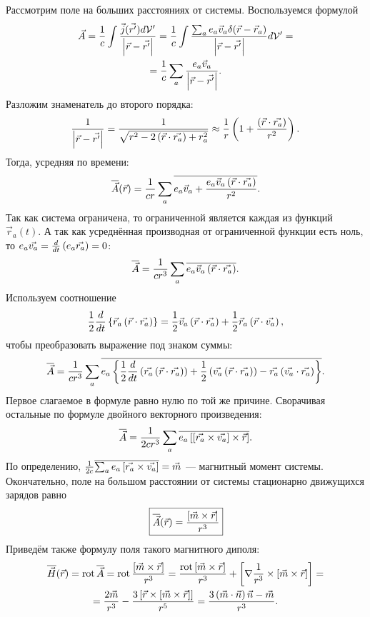     Рассмотрим поле на больших расстояниях от системы. Воспользуемся формулой
    \begin{gather*}
        \vec{A} = \frac 1c \int \frac{\vec{j}(\vec{r'})d\mathcal{V}'}{\left|{\vec{r} - \vec{r'}}\right|} = 
        \frac 1c \int \frac{\sum_ae_a\vec{v}_a\delta(\vec{r} - \vec{r}_a)}{\left|{\vec{r} - \vec{r'}}\right|}d\mathcal{V}' = \\ =
        \frac 1c \sum_a \frac{e_a\vec{v}_a}{\left|{\vec{r} - \vec{r'}}\right|}.
    \end{gather*}
    Разложим знаменатель до второго порядка:
    \[
        \frac{1}{\left|{\vec{r} - \vec{r'}}\right|} = \frac{1}{\sqrt{r^2 -2\left({\vec{r}\cdot\vec{r_a}}\right) + r_a^2}} \approx \frac 1r \left({1 + \frac{\left({\vec{r}\cdot\vec{r_a}}\right)}{r^2}}\right).
    \]
    Тогда, усредняя по времени:
    \begin{gather*}
        \overline{\vec{A}}(\vec{r}) = \frac{1}{cr}\sum_a\overline{e_a\vec{v}_a + \frac{e_a\vec{v}_a \left({\vec{r}\cdot\vec{r_a}}\right)}{r^2}}.
    \end{gather*}
    Так как система ограничена, то ограниченной является каждая из функций $\vec{r}_a(t)$. А так как усреднённая производная от 
    ограниченной функции есть ноль, то $e_a\vec{v_a} = \frac{d}{dt}\left({e_a\vec{r_a}}\right) = 0$:
    \[
        \overline{\vec{A}} = \frac{1}{cr^3}\sum_a\overline{e_a\vec{v}_a\left({\vec{r}\cdot\vec{r_a}}\right)}.
    \]
    Используем соотношение
    \[
        \frac 12 \frac{d}{dt}\left\{{\vec{r}_a \left({\vec{r}\cdot\vec{r_a}}\right)}\right\} = \frac 12 \vec{v}_a \left({\vec{r}\cdot\vec{r_a}}\right) + \frac 12 \vec{r}_a\left({\vec{r}\cdot\vec{v_a}}\right),
    \]
    чтобы преобразовать выражение под знаком суммы:
    \[
        \overline{\vec{A}} = \frac{1}{cr^3}\sum_a\overline{e_a\left\{{\frac 12 \frac{d}{dt} 
        \left({\vec{r_a}\left({\vec{r}\cdot\vec{r_a}}\right)}\right) + \frac 12 \left({\vec{v_a}\left({\vec{r}\cdot\vec{r_a}}\right)}\right) - \vec{r_a}\left({\vec{v_a}\cdot\vec{r_a}}\right)}\right\}}.
    \]
    Первое слагаемое в формуле равно нулю по той же причине. Сворачивая остальные по формуле двойного векторного произведения:
    \[
        \overline{\vec{A}} = \frac{1}{2cr^3}\sum_a\overline{e_a\left[{\left[{\vec{r_a}\times\vec{v_a}}\right] \times \vec{r}}\right]}.
    \]
    По определению, $\frac{1}{2c} \overline{\sum_ae_a \left[{\vec{r_a}\times\vec{v_a}}\right]} = \vec{m}$ --- магнитный момент системы.
    Окончательно, поле на большом расстоянии от системы стационарно движущихся зарядов равно
    \[
        \boxed{\overline{\vec{A}}(\vec{r}) = \frac{\left[{\vec{m}\times\vec{r}}\right]}{r^3}}
    \]
    Приведём также формулу поля такого магнитного диполя:
    \begin{gather*}
        \overline{\vec{H}}(\vec{r}) = \operatorname{rot}\overline{\vec{A}} = \operatorname{rot}\frac{\left[{\vec{m}\times\vec{r}}\right]}{r^3} = \frac{\operatorname{rot}\left[{\vec{m}\times\vec{r}}\right]}{r^3} + 
        \left[{\nabla\frac{1}{r^3} \times \left[{\vec{m}\times\vec{r}}\right]}\right] = \\ =
        \frac{2\vec{m}}{r^3} - \frac{3\left[{\vec{r} \times \left[{\vec{m}\times\vec{r}}\right]}\right]}{r^5} = \frac{3\left({\vec{m}\cdot\vec{n}}\right)\vec{n} - \vec{m}}{r^3}.
    \end{gather*}